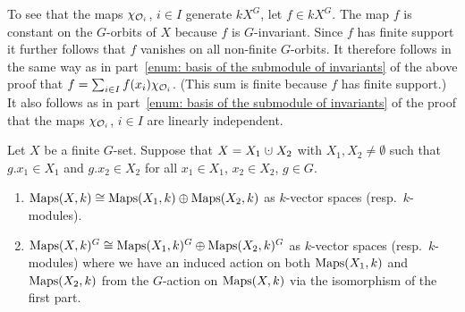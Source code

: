 \begin{fluff}
  To see that the maps $\chi_{\mathcal{O}_i}$, $i \in I$ generate $kX^G$, let $f \in kX^G$.
  The map $f$ is constant on the $G$-orbits of $X$ because $f$ is $G$-invariant.
  Since $f$ has finite support it further follows that $f$ vanishes on all non-finite $G$-orbits.
  It therefore follows in the same way as in part~\ref{enum: basis of the submodule of invariants} of the above proof that $f = \sum_{i \in I} f(x_i) \chi_{\mathcal{O}_i}$.
  (This sum is finite because $f$ has finite support.) 
  It also follows as in part~\ref{enum: basis of the submodule of invariants} of the proof that the maps $\chi_{\mathcal{O}_i}$, $i \in I$ are linearly independent.
\end{fluff}


\begin{lemma}
  Let $X$ be a finite $G$-set.
  Suppose that $X = X_1 \dotcup X_2$ with $X_1, X_2 \neq \emptyset$ such that $g.x_1 \in X_1$ and $g.x_2 \in X_2$ for all $x_1 \in X_1$, $x_2 \in X_2$, $g \in G$.
  \begin{enumerate}[label=\emph{\alph*)},leftmargin=*]
    \item
      $\operatorname{Maps}(X,k) \cong \operatorname{Maps}(X_1, k) \oplus \operatorname{Maps}(X_2, k)$ as $k$-vector spaces \textup(resp.\ $k$-modules\textup).
    \item
      $\operatorname{Maps}(X,k)^G \cong \operatorname{Maps}(X_1, k)^G \oplus \operatorname{Maps}(X_2, k)^G$ as $k$-vector spaces \textup(resp.\ $k$-modules\textup) where we have an induced action on both $\operatorname{Maps}(X_1, k)$ and $\operatorname{Maps}(X_2, k)$ from the $G$-action on $\operatorname{Maps}(X,k)$ via the isomorphism of the first part.
  \end{enumerate}
\end{lemma}
